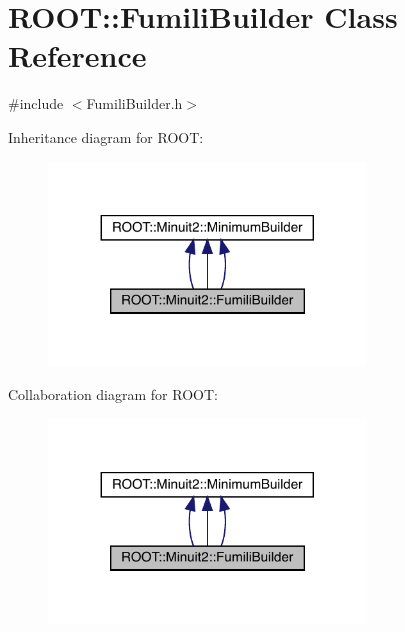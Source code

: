 \hypertarget{classROOT_1_1Minuit2_1_1FumiliBuilder}{}\section{R\+O\+OT\+:\+:Fumili\+Builder Class Reference}
\label{classROOT_1_1Minuit2_1_1FumiliBuilder}


{\ttfamily \#include $<$Fumili\+Builder.\+h$>$}



Inheritance diagram for R\+O\+OT\+:
\nopagebreak
\begin{figure}[H]
\begin{center}
\leavevmode
\includegraphics[width=239pt]{dc/d0a/classROOT_1_1Minuit2_1_1FumiliBuilder__inherit__graph}
\end{center}
\end{figure}


Collaboration diagram for R\+O\+OT\+:
\nopagebreak
\begin{figure}[H]
\begin{center}
\leavevmode
\includegraphics[width=239pt]{d2/d6e/classROOT_1_1Minuit2_1_1FumiliBuilder__coll__graph}
\end{center}
\end{figure}
